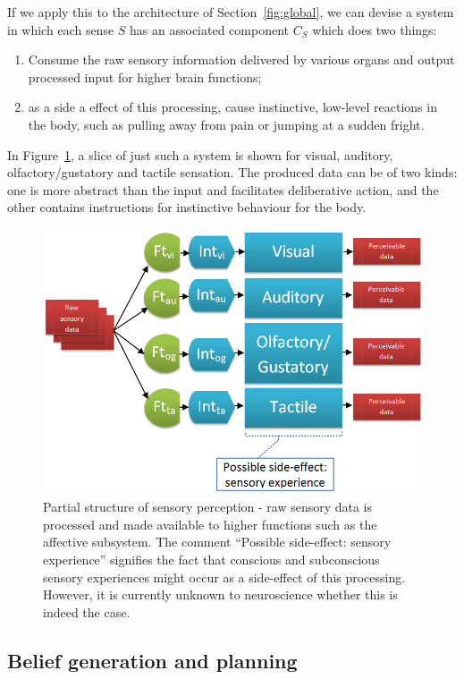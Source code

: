 If we apply this to the architecture of Section~\ref{fig:global}, we can devise a system in which each sense $S$ has an associated component $C_S$ which does two things:
\begin{enumerate}
	\item Consume the raw sensory information delivered by various organs and output processed input for higher brain functions;
	\item as a side a effect of this processing, cause  instinctive, low-level reactions in the body, such as pulling away from pain or jumping at a sudden fright.
\end{enumerate}

In Figure~\ref{fig:sensoryPerception}, a slice of just such a system is shown for visual, auditory, olfactory/gustatory and tactile sensation. The produced data can be of two kinds: one is more abstract than the input and facilitates deliberative action, and the other contains instructions for instinctive behaviour for the body.

\begin{figure}[!h]
	\centering
	\includegraphics[width=325pt]{Figs/sensoryPerception.png}
	\caption{Partial structure of sensory perception - raw sensory data is processed and made available to higher functions such as the affective subsystem. The comment ``Possible side-effect: sensory experience'' signifies the fact that conscious and subconscious sensory experiences might occur as a side-effect of this processing. However, it is currently unknown to neuroscience whether this is indeed the case.}
	\label{fig:sensoryPerception}
\end{figure}


\subsection{Belief generation and planning}\label{sec:worldSimulation}

